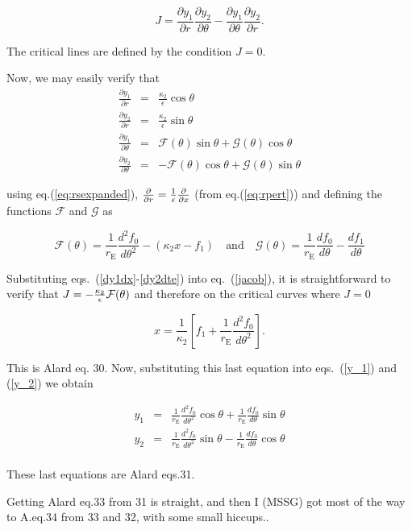 \documentclass{article}
\def\eqref{eq.(\ref}
\newcommand{\eps}{\epsilon}
\def \eps {\epsilon}
\def \te {\theta}
\def \pa {\partial}
\def \re {r_{\mathrm{E}}}
\def \te {\theta}
\def \kt {\kappa_2}
\def \scriptf {\mathcal{F}}
\def \scriptg {\mathcal{G}}
\def \pa {\partial}
\begin{document}
\begin{equation}
J=\frac{\pa y_1}{\pa r}\frac{\pa y_2}{\pa \te}-\frac{\pa y_1}{\pa \te}\frac{\pa y_2}{\pa r}.
\label{jacob}
\end{equation}

The critical lines are defined by the condition $J=0$. 

Now, we may easily verify that
\begin{eqnarray}
\frac{\pa y_1}{\pa r}&=& \frac{\kt}{\epsilon} \cos{\te}\label{dy1dx}   \\
\frac{\pa y_2}{\pa r}&=& \frac{\kt}{\epsilon} \sin{\te}\\
\frac{\pa y_1}{\pa \te}&=& \scriptf(\te)\sin{\te}+\scriptg(\te)\cos{\te}\\
\frac{\pa y_2}{\pa \te}&=& -\scriptf(\te)\cos{\te}+\scriptg(\te)\sin{\te}\label{dy2dte}
\end{eqnarray}

using \eqref{eq:rsexpanded}), ${\pa \over \pa r} ={ 1 \over \epsilon}
{\pa \over \pa x}$ (from \eqref{eq:rpert})) and defining the functions
$\scriptf$ and $\scriptg$ as

\begin{equation}
\scriptf(\te)=\frac{1}{\re}\frac{d^2f_0}{d\te^2}-(\kt x -f_1) \quad \textrm{and} \quad %
\scriptg(\te)=\frac{1}{\re}\frac{df_0}{d\te}-\frac{df_1}{d\te}
\end{equation}

Substituting eqs.~(\ref{dy1dx}-\ref{dy2dte}) into eq.~(\ref{jacob}), it is straightforward to verify that $J=-{\kt \over \eps} \scriptf(\te)$ and therefore on the critical curves where $J = 0$

\begin{equation}
x=\frac{1}{\kt}\left[f_1+\frac{1}{\re}\frac{d^2f_0}{d\te^2}\right] \label{xte}.
\end{equation}

This is Alard eq. 30. Now, substituting this last equation into eqs.~(\ref{y_1})
and (\ref{y_2}) we obtain

\begin{eqnarray*}
y_1 &=& \frac{1}{\re}\frac{d^2f_0}{d\te^2}\cos{\te}+\frac{1}{\re}\frac{df_0}{d\te}\sin{\te}\\
y_2 &=& \frac{1}{\re}\frac{d^2f_0}{d\te^2}\sin{\te}-\frac{1}{\re}\frac{df_0}{d\te}\cos{\te}\\
\end{eqnarray*}

These last equations are Alard eqs.31.



Getting Alard eq.33 from 31 is straight, and then I (MSSG) got most of the way to
A.eq.34 from 33 and 32, with some small hiccups..
\end{document}
